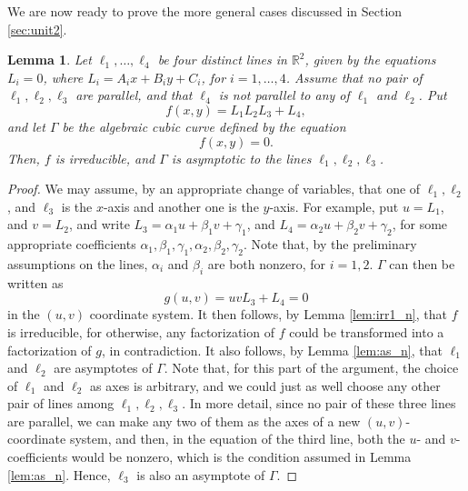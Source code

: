 \documentclass[12pt]{article}
\def\reals{{\mathbb R}}
\newtheorem{lemma}[theorem]{Lemma}
\begin{document}
We are now ready to prove the more general cases discussed in
Section \ref{sec:unit2}.
\begin{lemma} \label{lem:as1}
Let $\ell_1, \ldots, \ell_4$ be four distinct lines in
$\reals^2$, given by the equations $L_i = 0$, where
$L_i = A_i x + B_i y + C_i$, for $i = 1,\ldots,4$.
Assume that no pair of $\ell_1, \ell_2, \ell_3$ are parallel,
and that $\ell_4$ is not parallel to any of $\ell_1$ and $\ell_2$.
Put
$$f(x,y) = L_1 L_2 L_3 + L_4,$$
and
let $\Gamma$ be the algebraic cubic curve defined by the equation
\[
f(x,y) = 0.
\]
Then, $f$ is irreducible, and $\Gamma$ is asymptotic to the lines
$\ell_1, \ell_2, \ell_3$.
\end{lemma}
\begin{proof}
We may assume, by an appropriate change of variables, that one of
$\ell_1, \ell_2$, and $\ell_3$ is the $x$-axis and another one is
the $y$-axis. For example, put $u = L_1$, and $v = L_2$, and write
$L_3 = \alpha_1 u + \beta_1 v + \gamma_1$, and
$L_4 = \alpha_2 u + \beta_2 v + \gamma_2$,
for some appropriate coefficients
$\alpha_1, \beta_1, \gamma_1, \alpha_2, \beta_2, \gamma_2$.
Note that, by the preliminary assumptions on the lines,
$\alpha_i$ and $\beta_i$ are both nonzero, for $i=1,2$.
$\Gamma$ can then be written as
\[
g(u,v) = uv L_3 + L_4 = 0
\]
in the $(u,v)$ coordinate system. It then follows, by Lemma
\ref{lem:irr1_n}, that $f$ is irreducible, for otherwise, any
factorization of $f$ could be transformed into a factorization of
$g$, in contradiction.
It also follows, by Lemma \ref{lem:as_n}, that $\ell_1$ and
$\ell_2$ are asymptotes of $\Gamma$.
Note that, for this part of the argument, the choice of 
$\ell_1$ and $\ell_2$ as axes is arbitrary, and we could just 
as well choose any other pair of lines among $\ell_1,\ell_2,\ell_3$.
In more detail, since no pair of these three lines are parallel, we
can make any two of them as the axes of a new $(u,v)$-coordinate 
system, and then, in the equation of the third line, both the $u$- and
$v$-coefficients would be nonzero, which is the condition assumed in 
Lemma \ref{lem:as_n}. Hence, $\ell_3$ is also an asymptote of $\Gamma$.
\end{proof}
\end{document}

